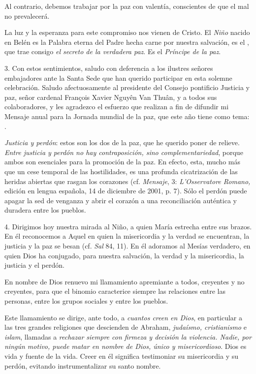 \begin{body}
\begin{body}
Al contrario, debemos trabajar por la paz con valentía, conscientes de que el mal no prevalecerá.

La luz y la esperanza para este compromiso nos vienen de Cristo. El \emph{Niño} nacido en Belén es la Palabra eterna del Padre hecha carne por nuestra salvación, es el , que trae consigo \emph{el secreto de la verdadera paz}. Es el \emph{Príncipe de la paz}.

3. Con estos sentimientos, saludo con deferencia a los ilustres señores embajadores ante la Santa Sede que han querido participar en esta solemne celebración. Saludo afectuosamente al presidente del Consejo pontificio Justicia y paz, señor cardenal François Xavier Nguyên Van Thuân, y a todos sus colaboradores, y les agradezco el esfuerzo que realizan a fin de difundir mi Mensaje anual para la Jornada mundial de la paz, que este año tiene como tema: .

\emph{Justicia y perdón}: estos son los dos  de la paz, que he querido poner de relieve. \emph{Entre justicia y perdón no hay contraposición, sino complementariedad}, porque ambos son esenciales para la promoción de la paz. En efecto, esta, mucho más que un cese temporal de las hostilidades, es una profunda cicatrización de las heridas abiertas que rasgan los corazones (cf. \emph{Mensaje}, 3: \emph{L'Osservatore Romano,} edición en lengua española, 14 de diciembre de 2001, p. 7). Sólo el perdón puede apagar la sed de venganza y abrir el corazón a una reconciliación auténtica y duradera entre los pueblos.

4. Dirigimos hoy nuestra mirada al Niño, a quien María estrecha entre sus brazos. En él reconocemos a Aquel en quien la misericordia y la verdad se encuentran, la justicia y la paz se besan (cf. \emph{Sal} 84, 11). En él adoramos al Mesías verdadero, en quien Dios ha conjugado, para nuestra salvación, la verdad y la misericordia, la justicia y el perdón.

En nombre de Dios renuevo mi llamamiento apremiante a todos, creyentes y no creyentes, para que el binomio  caracterice siempre las relaciones entre las personas, entre los grupos sociales y entre los pueblos.

Este llamamiento se dirige, ante todo, a \emph{cuantos creen en Dios}, en particular a las tres grandes religiones que descienden de Abraham, \emph{judaísmo, cristianismo} e \emph{islam}, llamadas a \emph{rechazar siempre con firmeza y decisión la violencia. Nadie, por ningún motivo, puede matar en nombre de Dios, único y misericordioso}. Dios es vida y fuente de la vida. Creer en él significa testimoniar su misericordia y su perdón, evitando instrumentalizar su santo nombre.


\end{body}
\end{body}
